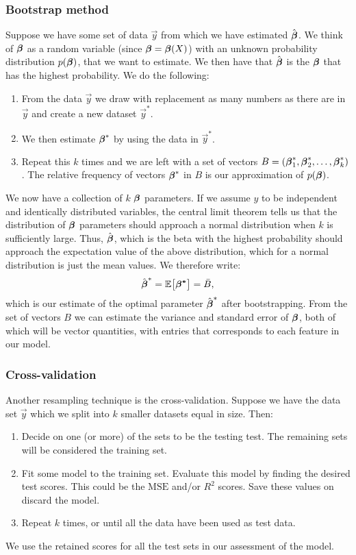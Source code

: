 \subsubsection{Bootstrap method}\label{sec:bootstrap}
Suppose we have some set of data $\vec{y}$ from which we have estimated $\hat{\boldsymbol{\beta}}$. We think of $\boldsymbol{\beta}$ as a random variable (since $\boldsymbol{\beta}=\boldsymbol{\beta}(X)$) with an unknown probability distribution $p(\mathbf{\boldsymbol{\beta}})$, that we want to estimate. We then have that $\hat{\boldsymbol{\beta}}$ is the $\boldsymbol{\beta}$ that has the highest probability. We do the following:
\begin{enumerate}
    \item From the data $\vec{y}$ we draw with replacement as many numbers as there are in $\vec{y}$ and create a new dataset $\vec{y}^*$.
    \item We then estimate $\boldsymbol{\beta}^*$ by using the data in $\vec{y}^*$. 
    \item Repeat this $k$ times and we are left with a set of vectors $B = (\boldsymbol{\beta}^*_1, \boldsymbol{\beta}^*_2, \dots, \boldsymbol{\beta}^*_k)$. The relative frequency of vectors $\boldsymbol{\beta}^*$ in $B$ is our approximation of $p(\boldsymbol{\beta})$. 
\end{enumerate}
We now have a collection of $k$ $\boldsymbol{\beta}$ parameters. If we assume $y$ to be independent and identically distributed variables, the central limit theorem tells us that the distribution of $\boldsymbol{\beta}$ parameters should approach a normal distribution when $k$ is sufficiently large. Thus, $\hat{\boldsymbol{\beta}}$, which is the beta with the highest probability should approach the expectation value of the above distribution, which for a normal distribution is just the mean values. We therefore write:
\begin{align*}
    \hat{\boldsymbol{\beta}}^* = \mathbb{E}\big[\boldsymbol{\beta^*}\big] = \bar{B},
\end{align*}
which is our estimate of the optimal parameter $\hat{\boldsymbol{\beta}}^*$ after bootstrapping. From the set of vectors $B$ we can estimate the variance and standard error of $\boldsymbol{\beta}$, both of which will be vector quantities, with entries that corresponds to each feature in our model. 

\subsubsection{Cross-validation}\label{sec:k_fold}
Another resampling technique is the cross-validation. Suppose we have the data set $\vec{y}$ which we split into $k$ smaller datasets equal in size. Then:
\begin{enumerate}
    \item Decide on one (or more) of the sets to be the testing test. The remaining sets will be considered the training set.
    \item Fit some model to the training set. Evaluate this model by finding the desired test scores. This could be the $\text{MSE}$ and/or $R^2$ scores. Save these values on discard the model. 
    \item Repeat $k$ times, or until all the data have been used as test data. 
\end{enumerate}
We use the retained scores for all the test sets in our assessment of the model. 
